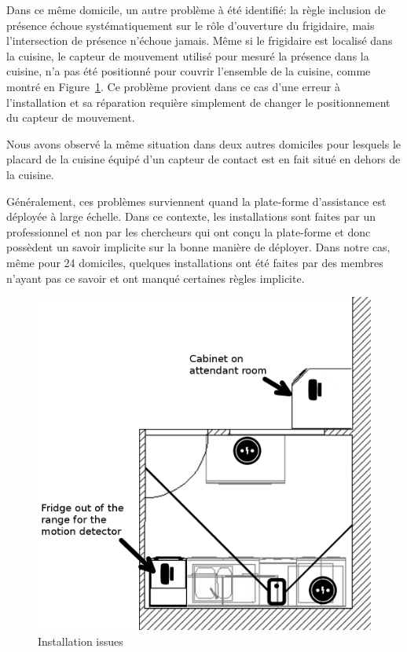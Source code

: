 Dans ce même domicile, un autre problème à été identifié: la règle inclusion de présence échoue systématiquement sur le rôle d'ouverture du frigidaire, mais l'intersection de présence n'échoue jamais. Même si le frigidaire est localisé dans la cuisine, le capteur de mouvement utilisé pour mesuré la présence dans la cuisine, n'a pas été positionné pour couvrir l'ensemble de la cuisine, comme montré en Figure~\ref{fig:map}. Ce problème provient dans ce cas d'une erreur à l'installation et sa réparation requière simplement de changer le positionnement du capteur de mouvement. %

Nous avons observé la même situation dans deux autres domiciles pour lesquels le placard de la cuisine équipé d'un capteur de contact est en fait situé en dehors de la cuisine.

Généralement, ces problèmes surviennent quand la plate-forme d'assistance est déployée à large échelle. Dans ce contexte, les installations sont faites par un professionnel et non par les chercheurs qui ont conçu la plate-forme et donc possèdent un savoir implicite sur la bonne manière de déployer. Dans notre cas, même pour 24 domiciles, quelques installations ont été faites par des membres n'ayant pas ce savoir et ont manqué certaines règles implicite.

\begin{figure}[!h]
  \centering
      \includegraphics[scale=0.2]{gfx/map.png}
      \caption{Installation issues}
      \label{fig:map}
\end{figure}

